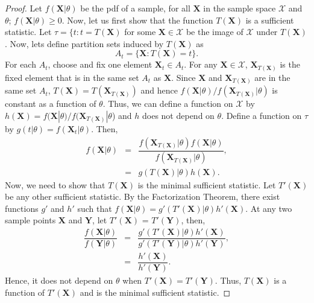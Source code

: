 \documentclass[a4paper,english,12pt]{article}
\newcommand{\bX}{\mathbf{X}}
\newcommand{\bY}{\mathbf{Y}}
\begin{document}
\begin{proof}
Let $f(\bX|\theta)$ be the pdf of a sample, for all $\bX$ in the sample space $\boldsymbol{\mathcal{X}}$ and $\theta$; $f(\bX|\theta)\geq 0$.
Now, let us first show that the function $T(\bX)$ is a sufficient statistic. Let $\tau = \{t:t=T(\bX)$ for some $\bX\in\boldsymbol{\mathcal{X}}$ be the image of $\boldsymbol{\mathcal{X}}$ under $T(\bX)$. Now, lets define partition sets induced by $T(\bX)$ as
\begin{equation}
A_t=\{\bX:T(\bX) = t\}.
\end{equation}
For each $A_t$, choose and fix one element $\bX_t \in A_t$. For any $\bX\in\boldsymbol{\mathcal{X}}$, $\bX_{T(\bX)}$ is the fixed element that is in the same set $A_t$ as $\bX$. Since $\bX$ and $\bX_{T(\bX)}$ are in the same set $A_t$, $T(\bX) = T(\bX_{T(\bX)})$ and hence $f(\bX|\theta)/f(\bX_{T(\bX)}|\theta)$ is constant as a function of $\theta$. Thus, we can define a function on $\boldsymbol{\mathcal{X}}$ by $h(\bX) = f(\bX|\theta)/f(\bX_{T(\bX)}|\theta$) and $h$ does not depend on $\theta$. Define a function on $\tau$ by $g(t|\theta)=f(\bX_t|\theta)$. Then,
\begin{eqnarray}
f(\bX|\theta)&=&\dfrac{f(\bX_{T(\bX)}|\theta)f(\bX|\theta)}{f(\bX_{T(\bX)}|\theta)},\\
&=&g(T(\bX)|\theta)h(\bX).
\end{eqnarray}
Now, we need to show that $T(\bX)$ is the minimal sufficient statistic. Let $T'(\bX)$ be any other sufficient statistic. By the Factorization Theorem, there exist functions $g'$ and $h'$ such that $f(\bX|\theta) = g'(T'(\bX)|\theta)h'(\bX).$ At any two sample points $\bX$ and $\bY$, let $T'(\bX)$ = $T'(\bY)$, then,
\begin{eqnarray}
\dfrac{f(\bX|\theta)}{f(\bY|\theta)} &=& \dfrac{g'(T'(\bX)|\theta)h'(\bX)}{g'(T'(\bY)|\theta)h'(\bY)},\\
&=& \dfrac{h'(\bX)}{h'(\bY)}.
\end{eqnarray}
Hence, it does not depend on $\theta$ when $T'(\bX)=T'(\bY)$. Thus, $T(\bX)$ is a function of $T'(\bX)$ and is the minimal sufficient statistic.
\end{proof}
\end{document}
